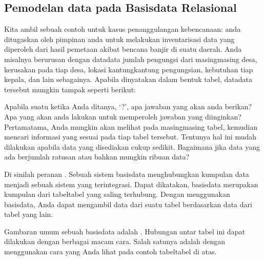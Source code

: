\documentclass[letterpaper,10pt,english]{sphinxmanual}
\begin{document}
\subsection{Pemodelan data pada Basisdata Relasional}
\label{\detokenize{sesi2/relationaldb:pemodelan-data-pada-basisdata-relasional}}
Kita ambil sebuah contoh untuk kasus penanggulangan kebencanaan: anda ditugaskan oleh pimpinan anda untuk melakukan inventarisasi data yang diperoleh dari hasil pemetaan akibat bencana banjir di suatu daerah. Anda misalnya berurusan dengan data\sphinxhyphen{}data jumlah pengungsi dari masing\sphinxhyphen{}masing desa, kerusakan pada tiap desa, lokasi kantung\sphinxhyphen{}kantung pengungsian, kebutuhan tiap kepala, dan lain sebagainya. Apabila dinyatakan dalam bentuk tabel, data\sphinxhyphen{}data tersebut mungkin tampak seperti berikut:



Apabila suatu ketika Anda ditanya, ‘?’, apa jawaban yang akan anda berikan? Apa yang akan anda lakukan untuk memperoleh jawaban yang diinginkan?	
Pertama\sphinxhyphen{}tama, Anda mungkin akan melihat pada masing\sphinxhyphen{}masing tabel, kemudian mencari informasi yang sesuai pada tiap tabel tersebut. Tentunya hal ini mudah dilakukan apabila data yang disediakan cukup sedikit. Bagaimana jika data yang ada berjumlah ratusan atau bahkan mungkin ribuan data?

Di sinilah peranan . Sebuah sistem basisdata menghubungkan kumpulan data menjadi sebuah sistem yang terintegrasi. Dapat dikatakan, basisdata merupakan kumpulan dari tabel\sphinxhyphen{}tabel yang saling terhubung. Dengan menggunakan basisdata, Anda dapat mengambil data dari suatu tabel berdasarkan data dari tabel yang lain.

Gambaran umum sebuah basisdata adalah . Hubungan antar tabel ini dapat dilakukan dengan berbagai macam cara. Salah satunya adalah dengan menggunakan cara yang Anda lihat pada contoh tabel\sphinxhyphen{}tabel di atas.
\end{document}
